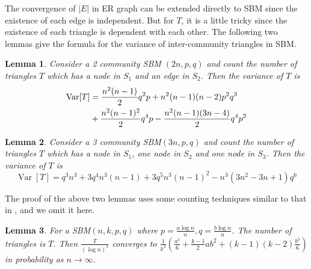 \documentclass[journal]{IEEEtran}
\newtheorem{lemma}{Lemma}
\newcommand{\1}{\mathbbm{1}}
\DeclareMathOperator{\Var}{Var}
\begin{document}
The convergence of $|E|$ in ER graph can be extended directly to SBM since the existence of each edge is independent.
But for $T$, it is a little tricky since the existence of each triangle is dependent with each other. The following two lemmas
give the formula for the variance of inter-community triangles in SBM.
\begin{lemma}\label{lem:SBM_tr_counting_cross}
	Consider a 2 community SBM $(2n, p, q)$ and count the number of triangles $T$ which has a node in $S_1$ and an edge in $S_2$.
Then the variance of $T$ is
\begin{align}
\Var[T] & = \frac{n^2(n-1)}{2}q^2p + n^2(n-1)(n-2)p^2q^3 \notag \\
& + \frac{n^2(n-1)^2}{2}q^4p - \frac{n^2(n-1)(3n-4)}{2}q^4 p^2 \label{eq:SBM_tr_counting_cross}
\end{align}
\end{lemma}
\begin{lemma}\label{lem:SBM_tr_counting_3}
	Consider a 3 community SBM$(3n, p, q)$ and count the number of triangles $T$ which has a node in $S_1$, one node in $S_2$ and one node in $S_3$.
	Then the variance of $T$ is
	\begin{equation*}\label{eq:SBM_tr_counting_three}
	\Var[T] = q^3 n^3 + 3q^4 n^3(n-1) + 3q^5 n^3 (n-1)^2 - n^3(3n^2-3n+1)q^6
	\end{equation*}
\end{lemma}
The proof of the above two lemmas uses some counting techniques similar to that in \cite{holland1977method}, and we omit it here.
\begin{lemma}\label{lem:sbmV}
	For a SBM$(n, k, p, q)$ where $p=\frac{a\log n}{n}, q = \frac{b\log n}{n}$. The number of triangles is $T$.
	Then $\frac{T}{(\log n)^3}$ converges to $\frac{1}{k^2}(\frac{a^3}{6} + \frac{k-1}{2}ab^2 + (k-1)(k-2)\frac{b^3}{6} )$ in probability as $n \to \infty$.
\end{lemma}
\end{document}
